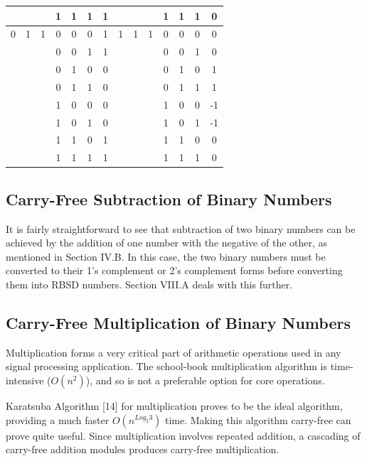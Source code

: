 \documentclass[conference]{IEEEtran_IBSS}
\begin{document}
\begin{table}[h!]
\begin{tabular}{|c|c|c|c|c|c||c|||c|c|c|c|c|c||c|}
    \hline
    & & & 1 & 1 & 1 & 1  &  & & & 1 & 1 & 1 & 0 \\
    \hline
    0 & 1 & 1 & 0 & 0 & 0 & 1  &  1 & 1 & 1 & 0 & 0 & 0 & 0 \\
    \hline
    & & & 0 & 0 & 1 & 1  &  & & & 0 & 0 & 1 & 0 \\
    \hline
    & & & 0 & 1 & 0 & 0  &  & & & 0 & 1 & 0 & 1 \\
    \hline
    & & & 0 & 1 & 1 & 0  &  & & & 0 & 1 & 1 & 1 \\
    \hline
    & & & 1 & 0 & 0 & 0  &  & & & 1 & 0 & 0 & -1 \\
    \hline
    & & & 1 & 0 & 1 & 0  &  & & & 1 & 0 & 1 & -1 \\
    \hline
    & & & 1 & 1 & 0 & 1  &  & & & 1 & 1 & 0 & 0 \\
    \hline
    & & & 1 & 1 & 1 & 1  &  & & & 1 & 1 & 1 & 0 \\
    \hline
  \end{tabular}
\end{table}

\subsection{Carry-Free Subtraction of Binary Numbers}

It is fairly straightforward to see that subtraction of two binary numbers can be achieved by the addition of one number with the negative of the other, as mentioned in Section IV.B. In this case, the two binary numbers must be converted to their 1’s complement or 2’s complement forms before converting them into RBSD numbers. Section VIII.A deals with this further.

\subsection{Carry-Free Multiplication of Binary Numbers}

Multiplication forms a very critical part of arithmetic operations used in any signal processing application. The school-book multiplication algorithm is time-intensive ($O(n^{2})$), and so is not a preferable option for core operations.

Karatsuba Algorithm [14] for multiplication proves to be the ideal algorithm, providing a much faster $O(n^{Log_{2}3})$ time. Making this algorithm carry-free can prove quite useful. Since multiplication involves repeated addition, a cascading of carry-free addition modules produces carry-free multiplication.
\end{document}
